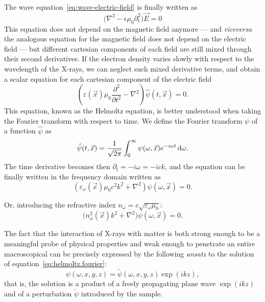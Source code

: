 The wave equation~\eqref{eq:wave-electric-field} is finally written as
\begin{equation}
    \big(\nabla^2 - \epsilon\mu_0\partial^2_t \big) \vec{E} = 0
\end{equation}
This equation does not depend on the magnetic field anymore --- and
\emph{viceversa} the analogous equation for the magnetic field does not
depend on the electric field --- but different cartesian components of each 
field are still mixed through their second derivatives. If the electron density varies slowly
with respect to the wavelength of the X-rays, we can neglect such mixed
derivative terms, and obtain a scalar equation for each cartesian component
of the electric field
\begin{equation}
    \left( \varepsilon(\vec{x}) \mu_0 \frac{\partial^2}{\partial t^2} - \nabla^2
    \right) \hat{\psi}(t, \vec{x}) = 0.\label{eq:helmoltz.spacetime}
\end{equation}
This equation, known as the Helmoltz equation, is better understood when
taking the Fourier transform with respect to time. We define the Fourier
transform $\psi$ of a function $\hat\psi$ as
\begin{equation}
    \hat{\psi}(t, \vec{x}) =
    \frac{1}{\sqrt{2\pi}}\int_{0}^{\infty}\psi(\omega, \vec{x})
    e^{-i \omega t} \operatorname{d}\!{\omega}.
\end{equation}
The time derivative becomes then $\partial_t = - i\omega = -i c k$, and the
equation can be finally written in the frequency domain written as
\begin{equation}
    \left( \varepsilon_\omega(\vec{x}) \mu_0 c^2 k^2 + \nabla^2
    \right) \psi(\omega, \vec{x}) = 0.
\end{equation}

Or, introducing the refractive index $n_\omega =
c\sqrt{\varepsilon_\omega\mu_0}$:
\begin{equation}
    \big( n_\omega^2(\vec{x}) k^2 + \nabla^2
    \big) \psi(\omega, \vec{x}) = 0.\label{eq:helmoltz.fourier}
\end{equation}

The fact that the interaction of X-rays with matter is both strong enough to
be a meaningful probe of physical properties and weak enough to penetrate an
entire macroscopical can be precisely expressed by the following
\emph{ansatz} to the solution of equation~\eqref{eq:helmoltz.fourier}:
    \begin{equation*}
 \psi(\omega, x, y, z) = \tilde{\psi}(\omega, x, y, z) \exp(ikz),    
\end{equation*}
that is, the solution is a product of a freely propagating plane wave
$\exp(ikz)$ and of a perturbation $\tilde{\psi}$ introduced by the sample.


